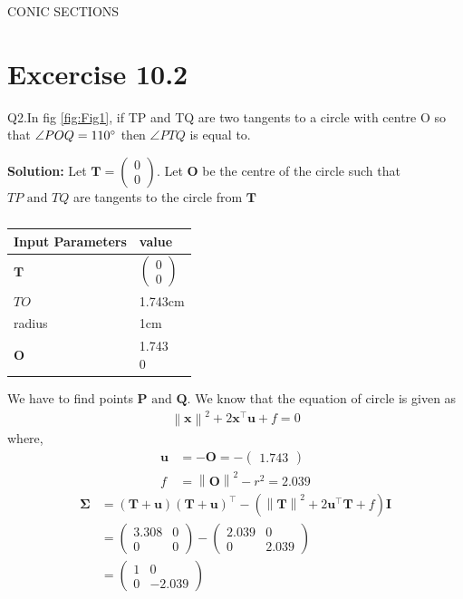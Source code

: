 \documentclass[12pt]{article}
\providecommand{\brak}[1]{\ensuremath{\left(#1\right)}}
\providecommand{\norm}[1]{\left\lVert#1\right\rVert}
\newcommand{\solution}{\noindent \textbf{Solution: }}
\newcommand{\myvec}[1]{\ensuremath{\begin{pmatrix}#1\end{pmatrix}}}
\let\vec\mathbf
\begin{document}
\begin{center}
\textbf\large{CONIC SECTIONS}

\end{center}
\section*{Excercise 10.2}
Q2.In fig \ref{fig:Fig1}, if TP and TQ are two tangents to a circle with centre O so that $\angle{POQ} = 110\degree$ then $\angle{PTQ}$ is equal to.

\solution
Let $\vec{T} = \myvec{0\\0}$. Let $\vec{O}$ be the centre of the circle such that $TP \text{ and } TQ$ are tangents to the circle from $\vec{T}$
\begin{table}[h!]
\begin{center}
\begin{tabular}{|m{4cm}|m{2cm}|}
	\hline
	\textbf{Input Parameters} & \textbf{value}\\ 
	\hline
	$\vec{T}$ & $\myvec{0\\0}$\\
	\hline
	$TO$ & 1.743cm\\
	\hline
	radius & 1cm\\
	\hline
	$\vec{O}$ & \myvec{1.743\\0}\\
	\hline
\end{tabular}
\caption{}
\label{table:Table1}
\end{center}
\end{table}
We have to find points $\vec{P} \text{ and } \vec{Q}$. We know that the equation of circle is given as
\begin{align}
	\norm{\vec{x}}^2+2\vec{x}^\top \vec{u}+f=0
\end{align}
where,
\begin{align}
	\vec{u} &= -\vec{O} = -\myvec{1.743}\\
	f &= \norm{\vec{O}}^2 - r^2 = 2.039
\end{align}
\begin{align}
	\vec{\Sigma} &= \brak{\vec{T}+\vec{u}}\brak{\vec{T}+\vec{u}}^\top - \brak{\norm{\vec{T}}^2 + 2\vec{u}^\top \vec{T}+f}\vec{I}\\
	&=\myvec{3.308&0 \\ 0&0} - \myvec{2.039&0 \\ 0&2.039}\\
	\label{eq:eq1}
	&=\myvec{1&0\\0&-2.039}
\end{align}
\end{document}
